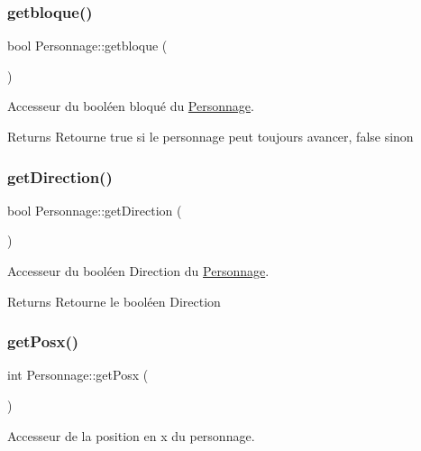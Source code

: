 \subsubsection{\texorpdfstring{getbloque()}{getbloque()}}
{\footnotesize\ttfamily bool Personnage\+::getbloque (\begin{DoxyParamCaption}{ }\end{DoxyParamCaption})}



Accesseur du booléen bloqué du \hyperlink{classPersonnage}{Personnage}. 

\begin{DoxyReturn}{Returns}
Retourne true si le personnage peut toujours avancer, false sinon 
\end{DoxyReturn}
\mbox{\label{classPersonnage_a943d205f1922133e6154aabc88905ff7}} 
\subsubsection{\texorpdfstring{get\+Direction()}{getDirection()}}
{\footnotesize\ttfamily bool Personnage\+::get\+Direction (\begin{DoxyParamCaption}{ }\end{DoxyParamCaption})}



Accesseur du booléen Direction du \hyperlink{classPersonnage}{Personnage}. 

\begin{DoxyReturn}{Returns}
Retourne le booléen Direction 
\end{DoxyReturn}
\mbox{\label{classPersonnage_a20df7b440cfc6f6e1b475920aa1d4215}} 
\subsubsection{\texorpdfstring{get\+Posx()}{getPosx()}}
{\footnotesize\ttfamily int Personnage\+::get\+Posx (\begin{DoxyParamCaption}{ }\end{DoxyParamCaption})}



Accesseur de la position en x du personnage. 


